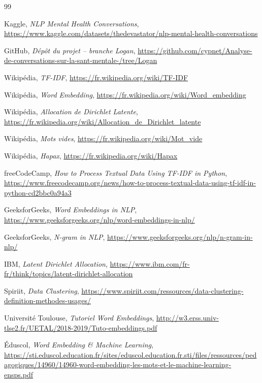 \documentclass[12pt,a4paper]{article}
\begin{document}
\begin{thebibliography}{99}

    Kaggle, \textit{NLP Mental Health Conversations}, 
    \url{https://www.kaggle.com/datasets/thedevastator/nlp-mental-health-conversations}

    GitHub, \textit{Dépôt du projet -- branche Logan},
    \url{https://github.com/cypnet/Analyse-de-conversations-sur-la-sant-mentale-/tree/Logan}

    Wikipédia, \textit{TF-IDF},
    \url{https://fr.wikipedia.org/wiki/TF-IDF}

    Wikipédia, \textit{Word Embedding},
    \url{https://fr.wikipedia.org/wiki/Word_embedding}

    Wikipédia, \textit{Allocation de Dirichlet Latente},
    \url{https://fr.wikipedia.org/wiki/Allocation_de_Dirichlet_latente}

    Wikipédia, \textit{Mots vides},
    \url{https://fr.wikipedia.org/wiki/Mot_vide}

    Wikipédia, \textit{Hapax},
    \url{https://fr.wikipedia.org/wiki/Hapax}

    freeCodeCamp, \textit{How to Process Textual Data Using TF-IDF in Python},
    \url{https://www.freecodecamp.org/news/how-to-process-textual-data-using-tf-idf-in-python-cd2bbc0a94a3}

    GeeksforGeeks, \textit{Word Embeddings in NLP},
    \url{https://www.geeksforgeeks.org/nlp/word-embeddings-in-nlp/}

    GeeksforGeeks, \textit{N-gram in NLP},
    \url{https://www.geeksforgeeks.org/nlp/n-gram-in-nlp/}

    IBM, \textit{Latent Dirichlet Allocation},
    \url{https://www.ibm.com/fr-fr/think/topics/latent-dirichlet-allocation}

    Spiriit, \textit{Data Clustering},
    \url{https://www.spiriit.com/ressources/data-clustering-definition-methodes-usages/}

    Université Toulouse, \textit{Tutoriel Word Embeddings},
    \url{http://w3.erss.univ-tlse2.fr/UETAL/2018-2019/Tuto-embeddings.pdf}

    Éduscol, \textit{Word Embedding \& Machine Learning},
    \url{https://sti.eduscol.education.fr/sites/eduscol.education.fr.sti/files/ressources/pedagogiques/14960/14960-word-embedding-les-mots-et-le-machine-learning-ensps.pdf}

\end{thebibliography}
\end{document}
